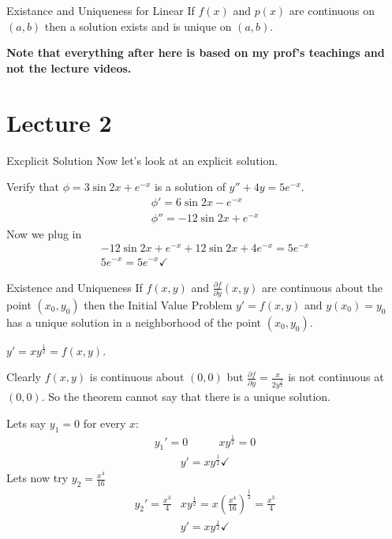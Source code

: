 \begin{theorem}{Existance and Uniqueness for Linear}{}
    If $f(x)$ and $p(x)$ are continuous on $(a,b)$ then a solution exists and is unique on $(a,b)$.
\end{theorem}

\textbf{Note that everything after here is based on my prof's teachings and not the lecture videos.}

\section{Lecture 2}
\begin{example}{Excplicit Solution}{}
    Now let's look at an explicit solution. \par
    Verify that $\phi = 3\sin 2x + e^{-x}$ is a solution of $y'' + 4y = 5e^{-x}$.
    \begin{align*}
        \phi ' = 6\sin {2x} - e^{-x} \\
        \phi '' = -12\sin {2x} + e^{-x} 
    \end{align*}
    Now we plug in
    \begin{gather*}
        -12\sin {2x} + e^{-x} + 12\sin 2x + 4e^{-x} = 5e^{-x} \\
        5e^{-x} = 5e^{-x} \checkmark
    \end{gather*}
\end{example}

\begin{theorem}{Existence and Uniqueness}{}
    If $f(x,y)$ and $\frac{\partial f}{\partial y}(x,y)$ are continuous about the point $(x_0, y_0)$ then the Initial Value Problem $y' = f(x,y)$ and $y(x_0) = y_0$ has a unique solution in a neighborhood of the point $(x_0,y_0)$.
\end{theorem}

\begin{example}{}{}
    $y' = xy^{\frac 12} = f(x,y)$. \par
    Clearly $f(x,y)$ is continuous about $(0,0)$ but $\frac{\partial f}{\partial y} = \frac{x}{2y^{\frac 12}}$ is not continuous at $(0,0)$. So the theorem cannot say that there is a unique solution. \par
    Lets say $y_1 = 0$ for every $x$:
    \begin{align*}
        y_1' = 0 \quad & \quad xy^{\frac 12} = 0 
    \end{align*}
    \begin{gather*}
        y' = xy^{\frac 12} \checkmark
    \end{gather*}
    Lets now try $y_2 = \frac{x^4}{16}$
    \begin{align*}
        y_2' = \frac{x^3}{4} & xy^{\frac 12} = x(\frac{x^4}{16})^{\frac 12} = \frac{x^3}{4}
    \end{align*}
    \begin{gather*}
        y' = xy^{\frac 12} \checkmark
    \end{gather*}
\end{example}

